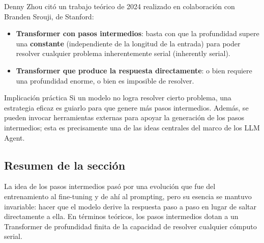 Denny Zhou citó un trabajo teórico de 2024 realizado en colaboración con Branden Srouji, de Stanford:

\begin{itemize}
    \item \textbf{Transformer con pasos intermedios}: basta con que la profundidad supere una \textbf{constante} (independiente de la longitud de la entrada) para poder resolver cualquier problema inherentemente serial (inherently serial).
    \item \textbf{Transformer que produce la respuesta directamente}: o bien requiere una profundidad enorme, o bien es imposible de resolver.
\end{itemize}

\begin{warningbox}{Implicación práctica}
Si un modelo no logra resolver cierto problema, una estrategia eficaz es guiarlo para que genere más pasos intermedios. Además, se pueden invocar herramientas externas para apoyar la generación de los pasos intermedios; esta es precisamente una de las ideas centrales del marco de los LLM Agent.
\end{warningbox}

\subsection{Resumen de la sección}

La idea de los pasos intermedios pasó por una evolución que fue del entrenamiento al fine-tuning y de ahí al prompting, pero su esencia se mantuvo invariable: hacer que el modelo derive la respuesta paso a paso en lugar de saltar directamente a ella. En términos teóricos, los pasos intermedios dotan a un Transformer de profundidad finita de la capacidad de resolver cualquier cómputo serial.

